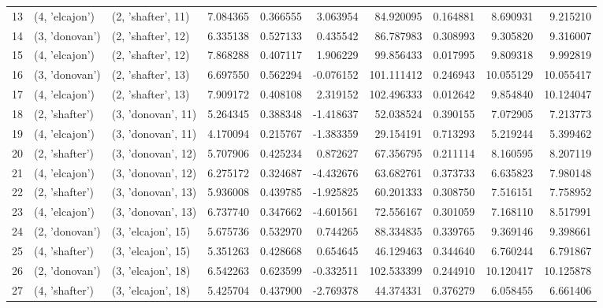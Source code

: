\begin{tabular}{lllrrrrrrr}
13 &   (4, 'elcajon') &  (2, 'shafter', 11) &   7.084365 &   0.366555 &  3.063954 &    84.920095 &   0.164881 &   8.690931 &   9.215210 \\
14 &   (3, 'donovan') &  (2, 'shafter', 12) &   6.335138 &   0.527133 &  0.435542 &    86.787983 &   0.308993 &   9.305820 &   9.316007 \\
15 &   (4, 'elcajon') &  (2, 'shafter', 12) &   7.868288 &   0.407117 &  1.906229 &    99.856433 &   0.017995 &   9.809318 &   9.992819 \\
16 &   (3, 'donovan') &  (2, 'shafter', 13) &   6.697550 &   0.562294 & -0.076152 &   101.111412 &   0.246943 &  10.055129 &  10.055417 \\
17 &   (4, 'elcajon') &  (2, 'shafter', 13) &   7.909172 &   0.408108 &  2.319152 &   102.496333 &   0.012642 &   9.854840 &  10.124047 \\
18 &   (2, 'shafter') &  (3, 'donovan', 11) &   5.264345 &   0.388348 & -1.418637 &    52.038524 &   0.390155 &   7.072905 &   7.213773 \\
19 &   (4, 'elcajon') &  (3, 'donovan', 11) &   4.170094 &   0.215767 & -1.383359 &    29.154191 &   0.713293 &   5.219244 &   5.399462 \\
20 &   (2, 'shafter') &  (3, 'donovan', 12) &   5.707906 &   0.425234 &  0.872627 &    67.356795 &   0.211114 &   8.160595 &   8.207119 \\
21 &   (4, 'elcajon') &  (3, 'donovan', 12) &   6.275172 &   0.324687 & -4.432676 &    63.682761 &   0.373733 &   6.635823 &   7.980148 \\
22 &   (2, 'shafter') &  (3, 'donovan', 13) &   5.936008 &   0.439785 & -1.925825 &    60.201333 &   0.308750 &   7.516151 &   7.758952 \\
23 &   (4, 'elcajon') &  (3, 'donovan', 13) &   6.737740 &   0.347662 & -4.601561 &    72.556167 &   0.301059 &   7.168110 &   8.517991 \\
24 &   (2, 'donovan') &  (3, 'elcajon', 15) &   5.675736 &   0.532970 &  0.744265 &    88.334835 &   0.339765 &   9.369146 &   9.398661 \\
25 &   (4, 'shafter') &  (3, 'elcajon', 15) &   5.351263 &   0.428668 &  0.654645 &    46.129463 &   0.344640 &   6.760244 &   6.791867 \\
26 &   (2, 'donovan') &  (3, 'elcajon', 18) &   6.542263 &   0.623599 & -0.332511 &   102.533399 &   0.244910 &  10.120417 &  10.125878 \\
27 &   (4, 'shafter') &  (3, 'elcajon', 18) &   5.425704 &   0.437900 & -2.769378 &    44.374331 &   0.376279 &   6.058455 &   6.661406 \\

\end{tabular}
